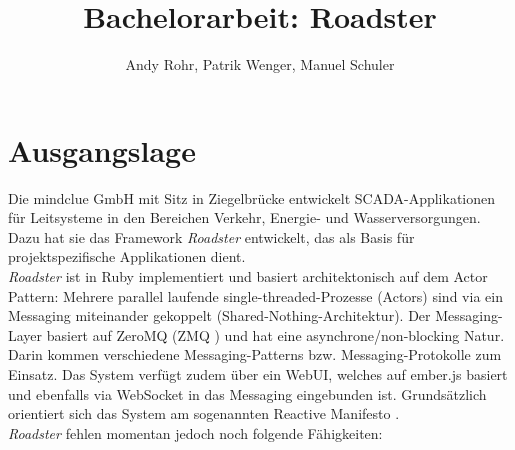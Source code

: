 \documentclass[a4paper]{article}
\title{Bachelorarbeit: Roadster}
\author{Andy Rohr, Patrik Wenger, Manuel Schuler}
\begin{document}
\lstset{language=ruby}
\thispagestyle{empty}
\maketitle

\section{Ausgangslage}

Die mindclue GmbH mit Sitz in Ziegelbrücke entwickelt SCADA-Applikationen für
Leitsysteme in den Bereichen Verkehr, Energie- und Wasserversorgungen. Dazu hat
sie das Framework \emph{Roadster} entwickelt, das als Basis für projektspezifische
Applikationen dient.\\

\emph{Roadster} ist in Ruby implementiert und basiert architektonisch auf dem Actor
Pattern: Mehrere parallel laufende single-threaded-Prozesse (Actors) sind via
ein Messaging miteinander gekoppelt (Shared-Nothing-Architektur). Der
Messaging-Layer basiert auf ZeroMQ (ZMQ \cite{zeromq}) und hat eine
asynchrone/non-blocking Natur. Darin kommen verschiedene Messaging-Patterns
bzw. Messaging-Protokolle zum Einsatz. Das System verfügt zudem über ein WebUI,
welches auf ember.js basiert und ebenfalls via WebSocket in das Messaging
eingebunden ist. Grundsätzlich orientiert sich das System am sogenannten
Reactive Manifesto \cite{reactivemanifesto}.\\


\emph{Roadster} fehlen momentan jedoch noch folgende Fähigkeiten:
\end{document}
